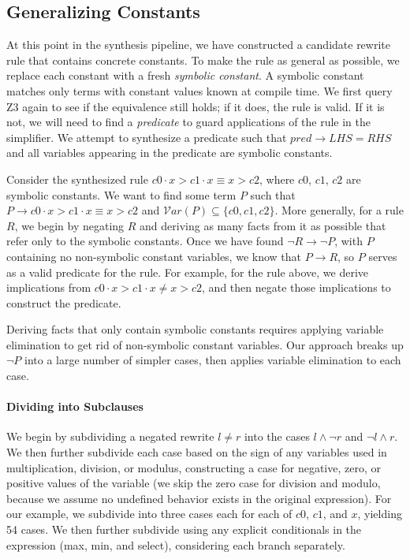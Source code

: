 \documentclass[sigplan,10pt,review,anonymous]{acmart}\settopmatter{printfolios=true,printccs=false,printacmref=false}
\begin{document}
\subsection{Generalizing Constants}

At this point in the synthesis pipeline, we have constructed a candidate rewrite
rule that contains concrete constants.  To make the rule as general as possible,
we replace each constant with a fresh \emph{symbolic constant}. A symbolic constant
 matches only terms with constant values known at compile time. We first query Z3
again to see if the equivalence still holds; if it does, the rule is valid. If
it is not, we will need to find a \textit{predicate} to guard
applications of the rule in the simplifier. We attempt to synthesize a predicate
such that $pred \rightarrow LHS = RHS$ and all variables appearing in the
predicate are symbolic constants.

Consider the synthesized rule $c0 \cdot x > c1 \cdot x \equiv x > c2$, where $c0$, $c1$,
$c2$ are symbolic constants. We want to find some term $P$ such that
$P \rightarrow c0 \cdot x > c1 \cdot x \equiv x > c2$ and
$\mathcal{V}ar(P) \subseteq \{c0, c1, c2\}$. More generally, for a rule $R$, we begin by
negating $R$ and deriving as many facts from it as possible that refer only to
the symbolic constants. Once we have found $\neg R \rightarrow \neg P$, with $P$ containing
no non-symbolic constant variables, we know that $P \rightarrow R$, so $P$ serves as a
valid predicate for the rule.  For example, for the rule above, we derive implications
from $c0 \cdot x > c1 \cdot x \neq x > c2$, and then negate those implications to
construct the predicate.

Deriving facts that only contain symbolic constants requires applying variable
elimination to get rid of non-symbolic constant variables.  Our approach breaks up $\neg P$ into
a large number of simpler cases, then applies variable elimination to each case.

\paragraph{Dividing into Subclauses} We begin by subdividing a negated rewrite $l \neq r$ into
the cases $l \wedge \neg r$ and $\neg l \wedge r$.  We then further subdivide each case based
on the sign of any variables used in multiplication, division, or modulus, constructing
a case for negative, zero, or positive values of the variable (we skip the zero case for
division and modulo, because we assume no undefined behavior exists in the original expression).
For our example, we subdivide into three cases each for each of $c0$, $c1$, and $x$, yielding
54 cases.  We then further subdivide using any explicit conditionals in the expression (max,
min, and select), considering each branch separately.
\end{document}
